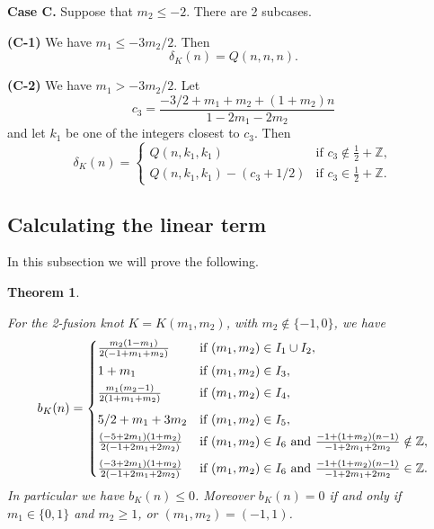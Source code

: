 \documentclass[11pt]{amsart}
\newtheorem{theorem}{Theorem}[section]
\theoremstyle{definition}
\def\BZ{\mathbb Z}
\begin{document}
\textbf{Case C.} Suppose that  $m_2 \le -2$. There are 2 subcases.

\textbf{(C-1)} We have $m_1 \le -3m_2/2$. Then 
$$\delta_K(n) = Q(n,n,n).$$

\textbf{(C-2)} We have $m_1 > -3m_2/2$. Let $$c_3=\frac{-3/2 + m_1 + m_2 + (1+m_2 ) n}{1-2m_1-2m_2}$$
and let $k_1$ be one of the integers closest to $c_3$. Then
$$\delta_K(n) = \begin{cases} Q(n,k_1,k_1) &\mbox{if } c_3 \notin \frac{1}{2} + \BZ, \\ 
Q(n,k_1,k_1)-(c_3 + 1/2) & \mbox{if } c_3 \in \frac{1}{2} + \BZ. \end{cases}$$

\subsection{Calculating the linear term}  In this subsection we will prove the following.

\begin{theorem}

\label{prop:b}

For the 2-fusion knot $K=K(m_1,m_2)$, with $m_2 \notin \{-1,0\}$, we have
$$
b_K(n) = \begin{cases} \frac{m_2(1-m_1)}{2(-1+m_1+m_2)} &\mbox{if } (m_1, m_2) \in I_1 \cup I_2, 
\smallskip
\\ 1 + m_1  & \mbox{if } (m_1, m_2) \in I_3, 
\smallskip
\\ \frac{m_1(m_2-1)}{2(1+m_1+m_2)}   & \mbox{if } (m_1, m_2) \in I_4, 
\medskip
\\ 5/2 + m_1 + 3 m_2  & \mbox{if } (m_1, m_2) \in I_5, 
\smallskip
\\ \frac {(-5 + 2m_1)(1 + m_2)} {2 (-1 + 2 m_1 + 2 m_2)} & \mbox{if } (m_1, m_2) \in I_6 \mbox{ and } \frac {-1+(1 + m_2)(n-1)} {-1 + 2 m_1 + 2 m_2} \notin  \BZ,
\medskip
\\ \frac {(-3 + 2m_1)(1 + m_2)} {2 (-1 + 2 m_1 + 2 m_2)} & \mbox{if } (m_1, m_2) \in I_6\mbox{ and } \frac {-1+(1 + m_2)(n-1)} {-1 + 2 m_1 + 2 m_2} \in  \BZ.
\end{cases}
$$
In particular we have $b_K(n) \le 0$. Moreover $b_K(n) = 0$ if and only if $m_1 \in \{0,1\}$ and $m_2 \ge 1$, or $(m_1, m_2) = (-1,1)$.
\end{theorem}
\end{document}
